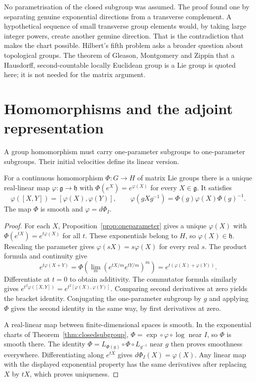 \begin{beauty}
No parametrisation of the closed subgroup was assumed.
The proof found one by separating genuine exponential directions from a
transverse complement. A hypothetical sequence of small transverse group
elements would, by taking large integer powers, create another genuine
direction. That is the contradiction that makes the chart possible.
Hilbert's fifth problem asks a broader question about topological groups.
The theorem of Gleason, Montgomery and Zippin that a Hausdorff,
second-countable locally Euclidean group is a Lie group is quoted here;
it is not needed for the matrix argument.
\end{beauty}

\section{Homomorphisms and the adjoint representation}

A group homomorphism must carry one-parameter subgroups to one-parameter
subgroups. Their initial velocities define its linear version.

\begin{theorem}\label{thm:homlie}
For a continuous homomorphism $\Phi:G\to H$ of matrix Lie groups there
is a unique real-linear map $\varphi:\mathfrak g\to\mathfrak h$ with
$\Phi(e^X)=e^{\varphi(X)}$ for every $X\in\mathfrak g$.
It satisfies
\[
 \varphi([X,Y])=[\varphi(X),\varphi(Y)],\qquad
 \varphi(gXg^{-1})=\Phi(g)\varphi(X)\Phi(g)^{-1}.
\]
The map $\Phi$ is smooth and $\varphi=d\Phi_I$.
\end{theorem}
\begin{proof}
For each $X$, Proposition~\ref{prop:oneparameter} gives a unique
$\varphi(X)$ with $\Phi(e^{tX})=e^{t\varphi(X)}$ for all $t$.
These exponentials belong to $H$, so $\varphi(X)\in\mathfrak h$.
Rescaling the parameter gives $\varphi(sX)=s\varphi(X)$ for every real $s$.
The product formula and continuity give
\[
 e^{t\varphi(X+Y)}
 =\Phi\left(\lim_m(e^{tX/m}e^{tY/m})^m\right)
 =e^{t(\varphi(X)+\varphi(Y))}.
\]
Differentiate at $t=0$ to obtain additivity.
The commutator formula similarly gives
$e^{t^2\varphi([X,Y])}=e^{t^2[\varphi(X),\varphi(Y)]}$.
Comparing second derivatives at zero yields the bracket identity.
Conjugating the one-parameter subgroup by $g$ and applying $\Phi$
gives the second identity in the same way, by first derivatives at zero.

A real-linear map between finite-dimensional spaces is smooth.
In the exponential charts of Theorem~\ref{thm:closedsubgroup},
$\Phi=\exp\circ\varphi\circ\log$ near $I$, so $\Phi$ is smooth there.
The identity
$\Phi=L_{\Phi(g)}\circ\Phi\circ L_{g^{-1}}$ near $g$
then proves smoothness everywhere. Differentiating along $e^{tX}$ gives
$d\Phi_I(X)=\varphi(X)$. Any linear map with the displayed exponential
property has the same derivatives after replacing $X$ by $tX$,
which proves uniqueness.
\end{proof}

